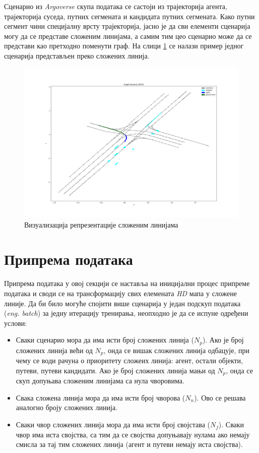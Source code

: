 \documentclass[11pt,oneside]{memoir}
\begin{document}
Сценарио из \textit{Argoverse} скупа података се састоји из трајекторија агента, трајекторија суседа, путних сегмената и кандидата путних сегмената.
Како путни сегмент чини специјалну врсту трајекторија, јасно је да сви елементи сценарија могу да се представе сложеним линијама, а самим тим
цео сценарио може да се представи као претходно поменути граф. На слици \ref{polylines-representation} се налази пример једног сценарија
представљен преко сложених линија.

\begin{figure}[H]
  \includegraphics[width=1.0\textwidth]{images/polylines-representation.png}
  \caption{Визуализација репрезентације сложеним линијама}
  \label{polylines-representation}
\end{figure}

\section{Припрема података}

Припрема података у овој секцији се наставља на иницијални процес припреме података и своди се на трансформацију свих елемената
\textit{HD} мапа у сложене линије. Да би било могуће спојити више сценарија у један подскуп података (\textit{eng. batch}) 
за једну итерацију тренирања, неопходно је да се испуне одређени услови:
\begin{itemize}
  \item Сваки сценарио мора да има исти број сложених линија ($N_{p}$). Ако је број сложених линија већи од $N_{p}$, онда се 
        вишак сложених линија одбацује, при чему се води рачуна о приоритету сложеих линија: агент, остали објекти, путеви, путеви кандидати.
        Ако је број сложених линија мањи од $N_{p}$, онда се скуп допуњава сложеним линијама са нула чворовима.
  \item Свака сложена линија мора да има исти број чворова ($N_{n}$). Ово се решава аналогно броју сложених линија.
  \item Сваки чвор сложених линија мора да има исти број својстава ($N_{f}$). Сваки чвор има иста својства, са тим
        да се својства допуњавају нулама ако немају смисла за тај тим сложених линија (агент и путеви немају иста својства).
\end{itemize}
\end{document}
